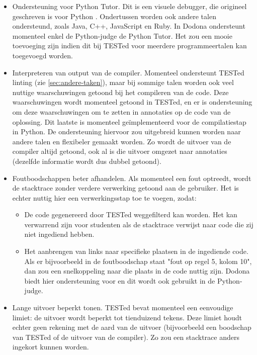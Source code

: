 \begin{itemize}
    \item Ondersteuning voor Python Tutor.
    Dit is een visuele debugger, die origineel geschreven is voor Python \autocite{10.1145/2445196.2445368}.
    Ondertussen worden ook andere talen ondersteund, zoals Java, C++, JavaScript en Ruby.
    In Dodona ondersteunt momenteel enkel de Python-judge de Python Tutor.
    Het zou een mooie toevoeging zijn indien dit bij TESTed voor meerdere programmeertalen kan toegevoegd worden.
    \item Interpreteren van output van de compiler.
    Momenteel ondersteunt TESTed linting (zie \cref{sec:andere-taken}), maar bij sommige talen worden ook veel nuttige waarschuwingen getoond bij het compileren van de code.
    Deze waarschuwingen wordt momenteel getoond in TESTed, en er is ondersteuning om deze waarschuwingen om te zetten in annotaties op de code van de oplossing.
    Dit laatste is momenteel geïmplementeerd voor de compilatiestap in Python.
    De ondersteuning hiervoor zou uitgebreid kunnen worden naar andere talen en flexibeler gemaakt worden.
    Zo wordt de uitvoer van de compiler altijd getoond, ook al is die uitvoer omgezet naar annotaties (dezelfde informatie wordt dus dubbel getoond).
    \item Foutboodschappen beter afhandelen.
    Als momenteel een fout optreedt, wordt de stacktrace zonder verdere verwerking getoond aan de gebruiker.
    Het is echter nuttig hier een verwerkingsstap toe te voegen, zodat:
    \begin{itemize}
        \item De code gegenereerd door TESTed weggefilterd kan worden.
        Het kan verwarrend zijn voor studenten als de stacktrace verwijst naar code die zij niet ingediend hebben.
        \item Het aanbrengen van links naar specifieke plaatsen in de ingediende code.
        Als er bijvoorbeeld in de foutboodschap staat "fout op regel 5, kolom 10", dan zou een snelkoppeling naar die plaats in de code nuttig zijn.
        Dodona biedt hier ondersteuning voor en dit wordt ook gebruikt in de Python-judge.
    \end{itemize}
    \item Lange uitvoer beperkt tonen.
    TESTed bevat momenteel een eenvoudige limiet: de uitvoer wordt beperkt tot tienduizend tekens.
    Deze limiet houdt echter geen rekening met de aard van de uitvoer (bijvoorbeeld een boodschap van TESTed of de uitvoer van de compiler).
    Zo zou een stacktrace anders ingekort kunnen worden.

\end{itemize}
